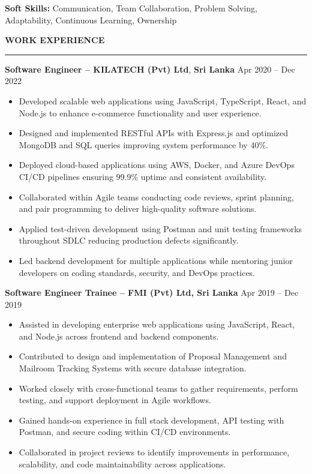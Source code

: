 \documentclass[10pt,letterpaper]{article}
\begin{document}
\textbf{Soft Skills:} Communication, Team Collaboration, Problem Solving, Adaptability, Continuous Learning, Ownership

\vspace{8pt}

\textbf{WORK EXPERIENCE}\\[-8pt]
\noindent\rule{\textwidth}{1pt}

\vspace{-2pt}

\textbf{Software Engineer -- KILATECH (Pvt) Ltd}, \textbf{Sri Lanka} \hfill Apr 2020 -- Dec 2022

\vspace{-1pt}

\begin{itemize}
\item Developed scalable web applications using JavaScript, TypeScript, React, and Node.js to enhance e-commerce functionality and user experience.
\item Designed and implemented RESTful APIs with Express.js and optimized MongoDB and SQL queries improving system performance by 40\%.
\item Deployed cloud-based applications using AWS, Docker, and Azure DevOps CI/CD pipelines ensuring 99.9\% uptime and consistent availability.
\item Collaborated within Agile teams conducting code reviews, sprint planning, and pair programming to deliver high-quality software solutions.
\item Applied test-driven development using Postman and unit testing frameworks throughout SDLC reducing production defects significantly.
\item Led backend development for multiple applications while mentoring junior developers on coding standards, security, and DevOps practices.
\end{itemize}

\textbf{Software Engineer Trainee -- FMI (Pvt) Ltd, Sri Lanka} \hfill Apr 2019 -- Dec 2019

\vspace{-1pt}

\begin{itemize}
\item Assisted in developing enterprise web applications using JavaScript, React, and Node.js across frontend and backend components.
\item Contributed to design and implementation of Proposal Management and Mailroom Tracking Systems with secure database integration.
\item Worked closely with cross-functional teams to gather requirements, perform testing, and support deployment in Agile workflows.
\item Gained hands-on experience in full stack development, API testing with Postman, and secure coding within CI/CD environments.
\item Collaborated in project reviews to identify improvements in performance, scalability, and code maintainability across applications.
\end{itemize}
\end{document}
